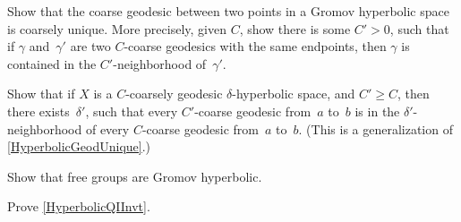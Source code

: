 \begin{exercises}

\item \label{HyperbolicGeodUnique}
Show that the coarse geodesic between two points in a Gromov hyperbolic space is coarsely unique. More precisely, given $C$, show there is some $C' > 0$, such that if $\gamma$ and~$\gamma'$ are two $C$-coarse geodesics with the same endpoints, then $\gamma$ is contained in the $C'$-neighborhood of~$\gamma'$.

\item \label{HyperbolicLargerC}
Show that if $X$ is a $C$-coarsely geodesic $\delta$-hyperbolic space, and $C' \ge C$, then there exists~$\delta'$, such that every $C'$-coarse geodesic from~$a$ to~$b$ is in the $\delta'$-neighborhood of every $C$-coarse geodesic from~$a$ to~$b$.
(This is a generalization of \cref{HyperbolicGeodUnique}.)

\item \label{FreeGrpsAreHyper}
Show that free groups are Gromov hyperbolic.

\item \label{HyperbolicQIInvtEx}
Prove \cref{HyperbolicQIInvt}.

\end{exercises}




